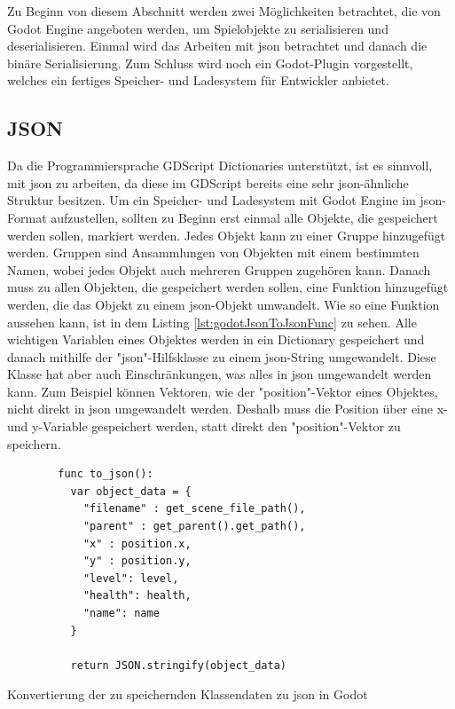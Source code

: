 Zu Beginn von diesem Abschnitt werden zwei Möglichkeiten betrachtet, die von Godot Engine angeboten werden, um Spielobjekte zu serialisieren und deserialisieren. Einmal wird das Arbeiten mit \ac{json} betrachtet und danach die binäre Serialisierung. Zum Schluss wird noch ein Godot-Plugin vorgestellt, welches ein fertiges Speicher- und Ladesystem für Entwickler anbietet. 



\subsection{JSON}
Da die Programmiersprache GDScript Dictionaries unterstützt, ist es sinnvoll, mit \ac{json} zu arbeiten, da diese im GDScript bereits eine sehr \ac{json}-ähnliche Struktur besitzen. Um ein Speicher- und Ladesystem mit Godot Engine im \ac{json}-Format aufzustellen, sollten zu Beginn erst einmal alle Objekte, die gespeichert werden sollen, markiert werden. Jedes Objekt kann zu einer Gruppe hinzugefügt werden. Gruppen sind Ansammlungen von Objekten mit einem bestimmten Namen, wobei jedes Objekt auch mehreren Gruppen zugehören kann. Danach muss zu allen Objekten, die gespeichert werden sollen, eine Funktion hinzugefügt werden, die das Objekt zu einem \ac{json}-Objekt umwandelt. Wie so eine Funktion aussehen kann, ist in dem Listing \ref{lst:godotJsonToJsonFunc} zu sehen. Alle wichtigen Variablen eines Objektes werden in ein Dictionary gespeichert und danach mithilfe der "\ac{json}"-Hilfsklasse zu einem \ac{json}-String umgewandelt. Diese Klasse hat aber auch Einschränkungen, was alles in \ac{json} umgewandelt werden kann. Zum Beispiel können Vektoren, wie der "position"-Vektor eines Objektes, nicht direkt in \ac{json} umgewandelt werden. Deshalb muss die Position über eine x- und y-Variable gespeichert werden, statt direkt den "position"-Vektor zu speichern.\cite{godotengineSavingGames}

\begin{listing}[htp]
    \begin{verbatim}
        func to_json():
          var object_data = {
            "filename" : get_scene_file_path(),
            "parent" : get_parent().get_path(),
            "x" : position.x, 
            "y" : position.y,
            "level": level,
            "health": health,
            "name": name
          }

          return JSON.stringify(object_data)
    \end{verbatim}
    \caption{Konvertierung der zu speichernden Klassendaten zu \ac{json} in Godot \cite{godotengineSavingGames}}
    \label{lst:godotJsonToJsonFunc}
\end{listing}

